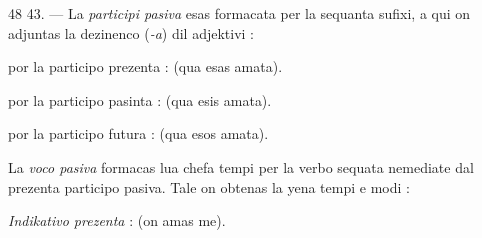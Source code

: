\begin{VUpage}[52]{48}
\VUblanc{5.84pt}%
43. --- La \textit{participi pasiva} esas formacata per la sequanta\nl
sufixi, a qui on adjuntas la dezinenco (\textit{-a}) dil adjektivi :

\VUblanc{2.89pt}%
 por la participo prezenta :  (qua esas amata).

 por la participo pasinta :  (qua esis amata).

 por la participo futura :  (qua esos amata).

\VUblanc{2.87pt}%
La \textit{voco pasiva} formacas lua chefa tempi per la verbo \nl
sequata nemediate dal prezenta participo pasiva. Tale on\nl
obtenas la yena tempi e modi :

\VUblanc{2.73pt}%
\textit{Indikativo prezenta} :  (on amas me).
\end{VUpage}

